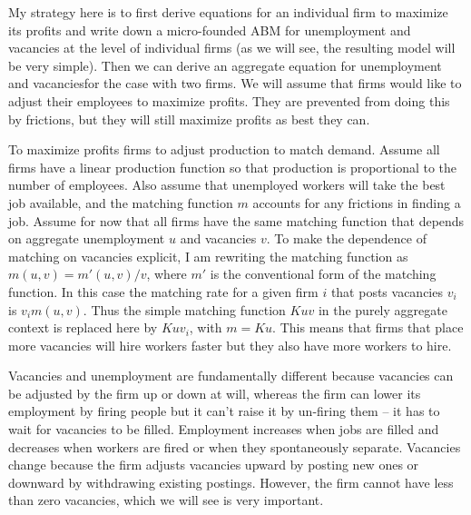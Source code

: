 My strategy here is to first derive equations for an individual firm to maximize its profits and write down a micro-founded ABM for unemployment and vacancies at the level of individual firms (as we will see, the resulting model will be very simple).  Then we can derive an aggregate equation for unemployment and vacanciesfor the case with two firms.  We will assume that firms would like to adjust their employees to maximize profits.  They are prevented from doing this by frictions, but they will still maximize profits as best they can.

To maximize profits firms to adjust production to match demand.  Assume all firms have a linear production function so that production is proportional to the number of employees.  Also assume that unemployed workers will take the best job available, and the matching function $m$ accounts for any frictions in finding a job.    Assume for now that all firms have the same matching function that depends on aggregate unemployment $u$ and vacancies $v$.  To make the dependence of matching on vacancies explicit, I am rewriting the matching function as $m(u,v) = m'(u,v)/v$, where $m'$ is the conventional form of the matching function.  In this case the matching rate for a given firm $i$ that posts vacancies $v_i$ is $v_i m(u,v)$.  Thus the simple matching function $K uv$ in the purely aggregate context is replaced here by $K u v_i$, with $m = K u$.  This means that firms that place more vacancies will hire workers faster but they also have more workers to hire. 

Vacancies and unemployment are fundamentally different because vacancies can be adjusted by the firm up or down at will, whereas the firm can lower its employment by firing people but it can't raise it by un-firing them -- it has to wait for vacancies to be filled.  Employment increases when jobs are filled and decreases when workers are fired or when they spontaneously separate.  Vacancies change because the firm adjusts vacancies upward by posting new ones or downward by withdrawing existing postings.  However, the firm cannot have less than zero vacancies, which we will see is very important. 

